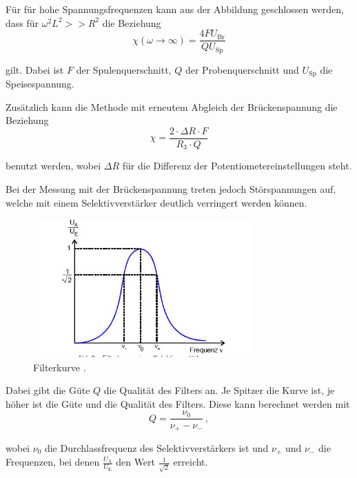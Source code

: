 \noindent
Für für hohe Spannungsfrequenzen kann aus der Abbildung geschlossen werden, dass für $\omega^2 L^2 >> R^2$ die Beziehung 
\begin{equation}
    \chi (\omega \to \infty) = \frac{4 F U_\text{Br}}{Q U_\text{Sp}} 
    \label{eqn:spannung}
\end{equation}

\noindent 
gilt. Dabei ist  $F$ der Spulenquerschnitt, $Q$ der Probenquerschnitt und $U_\text{Sp}$ die Speisespannung.

\noindent
Zusätzlich kann die Methode mit erneutem Abgleich der Brückenspannung die Beziehung 
\begin{equation}
    \chi = \frac{2 \cdot \Delta R \cdot F}{R_3\cdot Q}
    \label{eqn:alternativ}
\end{equation}

benutzt werden, wobei $\Delta R$ für die Differenz der Potentiometereinstellungen steht.


Bei der Messung mit der Brückenspannung treten jedoch Störspannungen auf, welche mit einem Selektivverstärker deutlich verringert werden können. 
\begin{figure}[H]
        \centering
        \includegraphics[width=0.75\textwidth]{Bilder/Kurve.jpg}
        \caption{Filterkurve \cite{V606}.}
        \label{fig:filterkurve2}
\end{figure}

\noindent
Dabei gibt die Güte $Q$ die Qualität des Filters an. Je Spitzer die Kurve ist, je höher ist die Güte und die Qualität des Filters. Diese kann berechnet werden mit 
\begin{equation}
        \label{eqn:güte}
        Q = \frac{\nu_0}{\nu_+ - \nu_-} \, ,
\end{equation}

\noindent
wobei $\nu_0$ die Durchlassfrequenz des Selektivverstärkers ist und $\nu_+$ und $\nu_-$ die Frequenzen, bei denen $\frac{U_\text{A}}{U_\text{E}}$ den Wert $\frac{1}{\sqrt{2}}$ erreicht.


